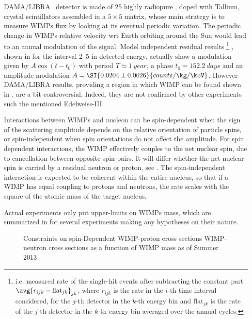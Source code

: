 DAMA/LIBRA~\cite{damalibra} detector is made of 25 highly radiopure , doped with Tallium, crystal scintillators assembled in a $5\times5$ matrix, whose main strategy is to measure WIMPs flux by looking at its eventual periodic variation. The periodic change in WIMPs relative velocity wrt Earth orbiting around the Sun would lead to an annual modulation of the signal. Model independent residual results
\footnote{i.e. measured rate of the single-hit events after subtracting the constant part $\avg{r_{ijk}-\text{flat}_{jk}}_{jk}$, where $r_{ijk}$ is the rate in the $i$-th time interval considered, for the $j$-th detector in the $k$-th energy bin and $\text{flat}_{jk}$ is the rate of the $j$-th detector in the $k$-th energy bin averaged over the annual cycles.}
, shown in \Fig{\ref{fig:damalibra}} for the interval \SIrange{2}{5}{\kev} in detected energy, actually show a modulation given by $A\cos{(t-t_0)}$ with period $T\simeq \SI{1}{year}$, a phase $t_0=\SI{152.2}{days}$ and an amplitude modulation $A =\SI{0.0204\pm0.0026}{counts/\kg/\keV}$. However DAMA/LIBRA results, providing a region in which WIMP can be found shown in \Fig{\ref{fig:WIMPcs}}, are a bit controversial. Indeed, they are not confirmed by other experiments such the mentioned Edelweiss-III.

Interactions between WIMPs and nucleon can be spin-dependent when the sign of the scattering amplitude depends on the relative orientation of particle spins, or spin-independent when spin orientations do not affect the amplitude. For spin dependent interactions, the WIMP effectively couples to the net nuclear spin, due to cancellation between opposite spin pairs. It will differ whether the net nuclear spin is carried by a residual neutron or proton, see \Fig{\ref{fig:WIMPcsSD}}. The spin-independent interaction is expected to be coherent within the entire nucleus, so that if a WIMP has equal coupling to protons and neutrons, the rate scales with the square of the atomic mass of the target nucleus. 

Actual experiments only put upper-limits on WIMPs mass, which are summarized in \Fig{\ref{fig:WIMPcs}} for several experiments making any hypotheses on their nature.

\begin{figure}[p]
\centering
{}\quad
{}

\caption{Constraints on spin-Dependent WIMP-proton cross sections WIMP-neutron cross sections  as a function of WIMP
mass as of Summer 2013}
\label{fig:WIMPcsSD}
\end{figure}

